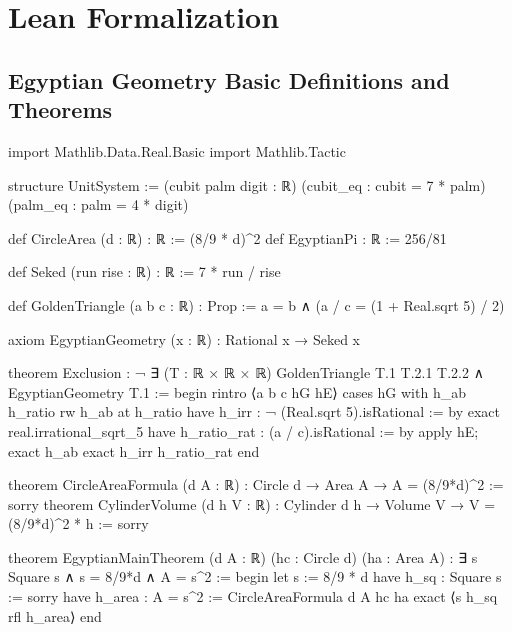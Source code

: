 \documentclass[12pt]{amsart}
\begin{document}
\section{Lean Formalization}

\subsection{Egyptian Geometry Basic Definitions and Theorems}
\begin{leanlisting}
	import Mathlib.Data.Real.Basic
	import Mathlib.Tactic
	
	structure UnitSystem :=
	(cubit palm digit : ℝ)
	(cubit_eq : cubit = 7 * palm)
	(palm_eq : palm = 4 * digit)
	
	def CircleArea (d : ℝ) : ℝ := (8/9 * d)^2
	def EgyptianPi : ℝ := 256/81
	
	def Seked (run rise : ℝ) : ℝ := 7 * run / rise
	
	def GoldenTriangle (a b c : ℝ) : Prop :=
	a = b ∧ (a / c = (1 + Real.sqrt 5) / 2)
	
	axiom EgyptianGeometry (x : ℝ) : Rational x → Seked x
	
	theorem Exclusion : ¬ ∃ (T : ℝ × ℝ × ℝ)   GoldenTriangle T.1 T.2.1 T.2.2 ∧ EgyptianGeometry T.1 :=
	begin
	rintro ⟨a   b   c   hG   hE⟩  
	cases hG with h_ab h_ratio  
	rw h_ab at h_ratio  
	have h_irr : ¬ (Real.sqrt 5).isRational :=
	by exact real.irrational_sqrt_5  
	have h_ratio_rat : (a / c).isRational :=
	by apply hE; exact h_ab  
	exact h_irr h_ratio_rat  
	end
	
	theorem CircleAreaFormula (d A : ℝ) : Circle d → Area A → A = (8/9*d)^2 := sorry
	theorem CylinderVolume (d h V : ℝ) : Cylinder d h → Volume V → V = (8/9*d)^2 * h := sorry
	
	theorem EgyptianMainTheorem (d A : ℝ) (hc : Circle d) (ha : Area A) : 
	∃ s   Square s ∧ s = 8/9*d ∧ A = s^2 :=
	begin
	let s := 8/9 * d  
	have h_sq : Square s := sorry  
	have h_area : A = s^2 := CircleAreaFormula d A hc ha  
	exact ⟨s   h_sq   rfl   h_area⟩  
	end
\end{leanlisting}
\end{document}
